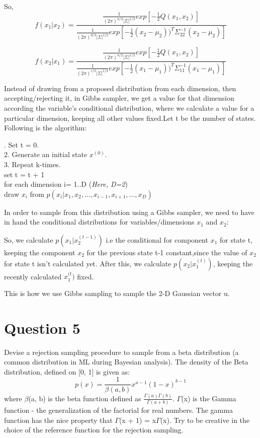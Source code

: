 \documentclass[12pt,a4paper]{article}
\begin{document}
So,
\begin{equation*}
f(x_1|x_2) = \frac{ \frac{1}{(2\pi )^{n/2}|\Sigma|^{1/2}}exp[-\frac{1}{2}Q(x_1,x_2)]}{\frac{1}{(2\pi )^{d/2}|\Sigma|^{1/2}}exp[-\frac{1}{2}(x_2-\mu_2))^T\Sigma_{22}^{-1}(x_2-\mu_2)]}
\end{equation*}

\begin{equation*}
f(x_2|x_1) = \frac{\frac{1}{(2\pi )^{n/2}|\Sigma|^{1/2}}exp[-\frac{1}{2}Q(x_1,x_2)]}{\frac{1}{(2\pi )^{c/2}|\Sigma|^{1/2}}exp[-\frac{1}{2}(x_1-\mu_1))^T\Sigma_{11}^{-1}(x_1-\mu_1)] 
}
\end{equation*}

Instead of drawing from a proposed distribution from each dimension, then accepting/rejecting it, in Gibbs sampler, we get a value for that dimension according the variable's conditional distribution, where we calculate a value for a particular dimension, keeping all other values fixed.Let t be the number of states. Following is the algorithm:

\begin{algorithm}[H]
. Set t = 0.\\
 2. Generate an initial state $x^{(0)}$.\\
 3. Repeat k-times. \\
\tab set t = t + 1\\
\tab for each dimension i= 1..D  (\textit{Here, D=2})\\
\tab draw $x_i$ from $p(x_i|x_1,x_2,...,x_{i-1},x_{i+1},...,x_D)$

\end{algorithm}

In order to sample from this distribution using a Gibbs sampler, we need to have in hand the conditional distributions for variables/dimensions $x_1$ and $x_2$:

So, we calculate $p(x_1|x_2^{(t-1)})$ i.e the conditional for component $x_1$ for state t, keeping the component $x_2$ for the previous state t-1 constant,since the value of $x_2$ for state t isn't calculated yet. After this, we calculate $p(x_2|x_1^{(t)})$, keeping the recently calculated $x_1^{(t})$ fixed. 

This is how we use Gibbs sampling to sample the 2-D Gaussian vector u.
\section{Question 5}
Devise a rejection sampling procedure to sample from a beta distribution (a common distribution in ML during Bayesian analysis). The density of the Beta distribution, defined on [0, 1] is given as:
\begin{equation*}
    p(x) = \frac{1}{\beta(a,b)}x^{a-1}(1-x)^{b-1}
\end{equation*}
where $\beta$(a, b) is the beta function defined as $\frac{\Gamma(a)\Gamma(b)}{\Gamma(a+b)}$. $\Gamma$(x) is the Gamma function - the generalization of the factorial for real numbers. The gamma function has the nice property that $\Gamma$(x + 1) = x$\Gamma$(x). Try to be creative in the choice of the reference function for the rejection sampling.
\end{document}
